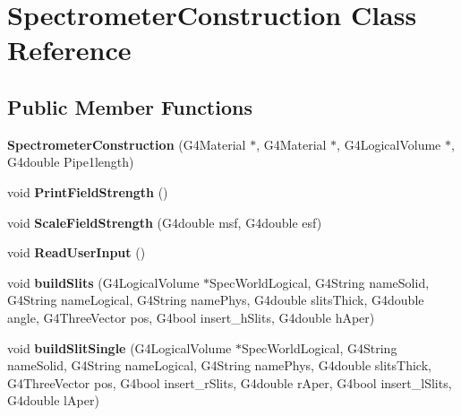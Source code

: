 \hypertarget{classSpectrometerConstruction}{\section{Spectrometer\-Construction Class Reference}
\label{classSpectrometerConstruction}
}
\subsection*{Public Member Functions}
\begin{DoxyCompactItemize}
\item 
\hypertarget{classSpectrometerConstruction_a6b26b8f616d7c08d5d1d63cb7568216f}{{\bfseries Spectrometer\-Construction} (G4\-Material $\ast$, G4\-Material $\ast$, G4\-Logical\-Volume $\ast$, G4double Pipe1length)}\label{classSpectrometerConstruction_a6b26b8f616d7c08d5d1d63cb7568216f}

\item 
\hypertarget{classSpectrometerConstruction_ad26f83a8a7106f39ad6caed5e012bcec}{void {\bfseries Print\-Field\-Strength} ()}\label{classSpectrometerConstruction_ad26f83a8a7106f39ad6caed5e012bcec}

\item 
\hypertarget{classSpectrometerConstruction_a8ab3d828bb6d80cac29f4fa8b6a77808}{void {\bfseries Scale\-Field\-Strength} (G4double msf, G4double esf)}\label{classSpectrometerConstruction_a8ab3d828bb6d80cac29f4fa8b6a77808}

\item 
\hypertarget{classSpectrometerConstruction_a34b3ae954aafe7734b3d5451a2339886}{void {\bfseries Read\-User\-Input} ()}\label{classSpectrometerConstruction_a34b3ae954aafe7734b3d5451a2339886}

\item 
\hypertarget{classSpectrometerConstruction_a6fff28e5fd2286884c4d1c3eaf6b1fa5}{void {\bfseries build\-Slits} (G4\-Logical\-Volume $\ast$Spec\-World\-Logical, G4\-String name\-Solid, G4\-String name\-Logical, G4\-String name\-Phys, G4double slits\-Thick, G4double angle, G4\-Three\-Vector pos, G4bool insert\-\_\-h\-Slits, G4double h\-Aper)}\label{classSpectrometerConstruction_a6fff28e5fd2286884c4d1c3eaf6b1fa5}

\item 
\hypertarget{classSpectrometerConstruction_ada8cbb45dddb279db8aa86322c3f2d76}{void {\bfseries build\-Slit\-Single} (G4\-Logical\-Volume $\ast$Spec\-World\-Logical, G4\-String name\-Solid, G4\-String name\-Logical, G4\-String name\-Phys, G4double slits\-Thick, G4\-Three\-Vector pos, G4bool insert\-\_\-r\-Slits, G4double r\-Aper, G4bool insert\-\_\-l\-Slits, G4double l\-Aper)}\label{classSpectrometerConstruction_ada8cbb45dddb279db8aa86322c3f2d76}


\end{DoxyCompactItemize}
